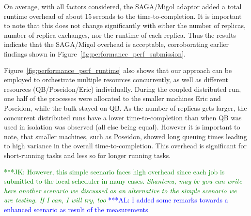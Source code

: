 \documentclass{rspublic}
\newcommand{\kimnote}[1]{ {\textcolor{green} { ***JK: #1 }}}
\newcommand{\alnote}[1]{ {\textcolor{blue} { ***AL: #1 }}}
\newcommand{\kimnote}[1]{}
\newcommand{\alnote}[1]{}
\begin{document}
On average, with all factors considered, the SAGA/Migol adaptor added
a total runtime overhead of about 15\,seconds to the
time-to-completion.  It is important to note that this does not change
significantly with either the number of replicas, number of
replica-exchanges, nor the runtime of each replica.  Thus the results
indicate that the SAGA/Migol overhead is acceptable, corroborating
earlier findings shown in
Figure~\ref{fig:performance_perf_submission}.




Figure~\ref{fig:performance_perf_runtime} also shows that our approach
can be employed to orchestrate multiple resources concurrently, as
well as different resources (QB/Poseidon/Eric) individually.  During
the coupled distributed run, one half of the processes were allocated to
the smaller machines Eric and Poseidon, while the bulk stayed on QB.  As the
number of replicas gets larger, the concurrent distributed runs have a
lower time-to-completion than when QB was used in isolation was
observed (all else being equal). However it is important to note, that
smaller machines, such as Poseidon, showed long queuing times leading
to high variance in the overall time-to-completion. This overhead is
significant for short-running tasks and less so for longer running
tasks. 

\kimnote{However, this simple scenario faces high overhead since each
  job is submitted to the local scheduler in many cases. \it
  Shantenu, may be you can write here another scenario we discussed
  as an alternative to the simple scenario we are testing.  If I can,
  I will try, too }            
\alnote{I added some remarks towards a enhanced scenario as result of the measurements}  
  
\end{document}
